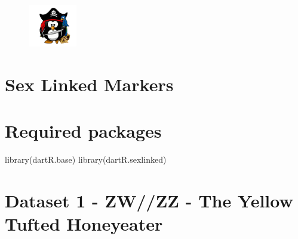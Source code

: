 \documentclass[
  letterpaper,
  DIV=11,
  numbers=noendperiod]{scrreprt}
\newenvironment{Shaded}{\begin{snugshade}}{\end{snugshade}}
\newcommand{\FunctionTok}[1]{\textcolor[rgb]{0.02,0.16,0.49}{#1}}
\newcommand{\NormalTok}[1]{\textcolor[rgb]{0.00,0.44,0.13}{#1}}
\begin{document}
\begin{figure}

{\centering \includegraphics[width=0.83333in,height=\textheight]{images/pirat.png}

}

\end{figure}


\hypertarget{sex-linked-markers}{%
\chapter*{Sex Linked Markers}\label{sex-linked-markers}}



\hypertarget{required-packages}{%
\chapter*{Required packages}\label{required-packages}}


\begin{Shaded}
\begin{Highlighting}[]
\FunctionTok{library}\NormalTok{(dartR.base)}
\FunctionTok{library}\NormalTok{(dartR.sexlinked)}
\end{Highlighting}
\end{Shaded}


\hypertarget{dataset-1---zwzz---the-yellow-tufted-honeyeater}{%
\chapter*{Dataset 1 - ZW//ZZ - The Yellow Tufted
Honeyeater}\label{dataset-1---zwzz---the-yellow-tufted-honeyeater}}

\end{document}
